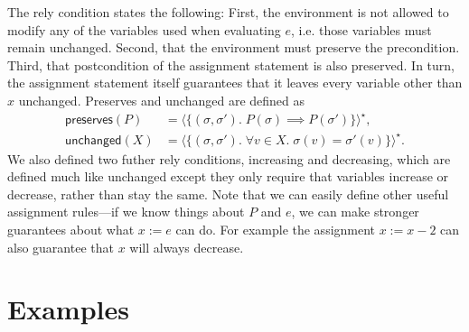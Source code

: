 \documentclass{llncs}
\newcommand{\unchanged}{\mathsf{unchanged}}
\newcommand{\preserves}{\mathsf{preserves}}
\begin{document}
The rely condition states the following: First, the environment is not
allowed to modify any of the variables used when evaluating $e$,
i.e. those variables must remain unchanged. Second, that the
environment must preserve the precondition. Third, that postcondition
of the assignment statement is also preserved. In turn, the assignment
statement itself guarantees that it leaves every variable other than
$x$ unchanged. Preserves and unchanged are defined as
\begin{align*}
\preserves(P) &= \langle \{(\sigma,\sigma').\; P(\sigma) \implies P(\sigma')\}\rangle^\star,\\
\unchanged(X) &= \langle \{(\sigma,\sigma').\; \forall v\in X.\; \sigma(v) = \sigma'(v)\}\rangle^\star.
\end{align*}
We also defined two futher rely conditions, increasing and decreasing,
which are defined much like unchanged except they only require that
variables increase or decrease, rather than stay the same. Note that
we can easily define other useful assignment rules---if we know things
about $P$ and $e$, we can make stronger guarantees about what $x := e$
can do. For example the assignment $x := x - 2$ can also guarantee
that $x$ will always decrease.

\section{Examples}

\end{document}
